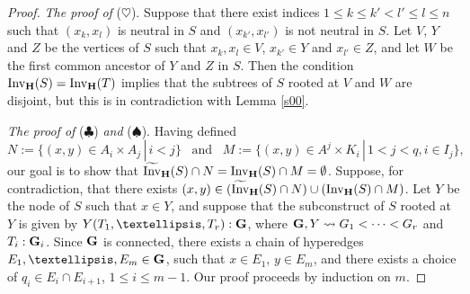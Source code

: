 \documentclass[10pt,a4paper]{amsart}
\newcommand{\Invt}{\widetilde{\mathrm{Inv}}}
\newcommand{\Inv}{{\mathrm{Inv}}}
\begin{document}
\begin{proof}
{\em The proof of} ($\heartsuit$). Suppose that there exist indices $1\leq k\leq k'<l'\leq l\leq n$ such that $(x_k,x_l)$ is neutral in $S$ and $(x_{k'},x_{l'})$ is not neutral in $S$. Let $V$, $Y$ and $Z$ be the vertices of $S$ such that $x_k,x_l\in V$, $x_{k'}\in Y$ and $x_{l'}\in Z$, and let $W$ be the first common ancestor of $Y$ and $Z$ in $S$. Then the condition $\Inv_{\bf H}(S)= \Inv_{\bf H}(T)$ implies that the subtrees of $S$ rooted at $V$ and $W$ are disjoint, but this is in contradiction with Lemma \ref{s00}.

\smallskip 
{\em The proof of} ($\clubsuit$) {\em and} ($\spadesuit$). Having defined $$N:=\{(x,y)\in A_i\times A_j\,|\, i<j\}\enspace \mbox{ and } \enspace M:=\{(x,y)\in A^j\times K_i\,|\, 1<j<q, i\in I_j\},$$ our goal is to show that $\Invt_{\bf H}(S)\cap N=\Inv_{\bf H}(S)\cap M=\emptyset$. Suppose, for contradiction, that there exists $(x,y)\in (\Invt_{\bf H}(S)\cap N)\cup (\Inv_{\bf H}(S)\cap M)$. Let $Y$ be the node of $S$ such that $x\in Y$, and suppose that the subconstruct of $S$ rooted at $Y$ is given by $Y(T_1,\dots,T_r):{\bf G}$, where ${\bf G},Y\leadsto G_1<\cdots <G_r$ and $T_i:{\bf G}_i$. Since ${\bf G}$ is connected, there exists a chain of hyperedges $E_1,\dots,E_m\in{\bf G}$, such that $x\in E_1$, $y\in E_m$, and there exists a choice of $q_i\in E_i\cap E_{i+1}$, $1\leq i\leq m-1$. Our proof proceeds by induction on $m$.

\smallskip


\end{proof}
\end{document}
